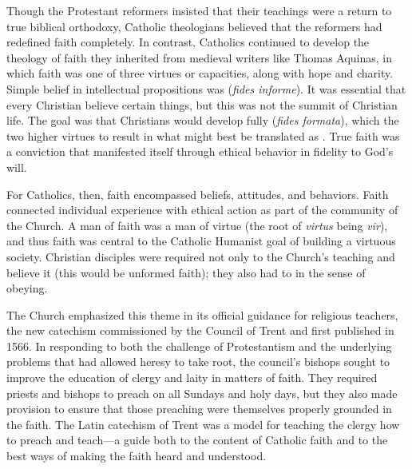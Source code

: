 Though the Protestant reformers insisted that their teachings were a return to
true biblical orthodoxy, Catholic theologians believed that the reformers had
redefined faith completely.
In contrast, Catholics continued to develop the theology of faith they inherited
from medieval writers like Thomas Aquinas, in which faith was one of three
virtues or capacities, along with hope and charity.%
    \Autocite[130--132]{Schreiner:Certainty}
Simple belief in intellectual propositions was 
(\emph{fides informe}).%
    \Autocite[]{Catholic:Catechismus1614}
It was essential that every Christian believe certain things, but this was not
the summit of Christian life.
The goal was that Christians would develop fully 
(\emph{fides formata}), which  the two higher virtues to
result in  what might best be translated as .
True faith was a conviction that manifested itself through ethical behavior in
fidelity to God's will.

For Catholics, then, faith encompassed beliefs, attitudes, and behaviors.
Faith connected individual experience with ethical action as part of the
community of the Church.
A man of faith was a man of virtue (the root of \emph{virtus} being \emph{vir}),
and thus faith was central to the Catholic Humanist goal of building a virtuous
society.
Christian disciples were required not only to  the Church's
teaching and believe it (this would be unformed faith); they also had to
 in the sense of obeying.

The Church emphasized this theme in its official guidance for religious
teachers, the new catechism  commissioned by the
Council of Trent and first published in 1566.%
    \Autocites[]{Catholic:Catechismus1614}{NewCatholic}
In responding to both the challenge of Protestantism and the underlying problems
that had allowed heresy to take root, the council's bishops sought to improve
the education of clergy and laity in matters of faith.%
    \Autocite[]{NewCatholic}
They required priests and bishops to preach on all Sundays and holy days, but
they also made provision to ensure that those preaching were themselves properly
grounded in the faith.
The Latin catechism of Trent was a model for teaching the clergy how to preach
and teach---a guide both to the content of Catholic faith and to the best ways
of making the faith heard and understood.

